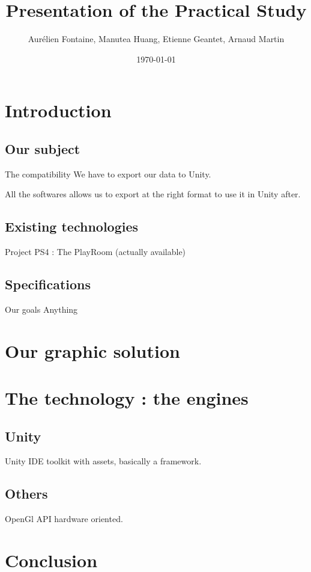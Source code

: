\documentclass[a4paper,10pt]{beamer}
\title{Presentation of the Practical Study}
\author[Groupe 3INFO]{Aurélien Fontaine, Manutea Huang, Etienne Geantet, Arnaud Martin}
\institute[INSA de Rennes]{Institut National des Sciences Appliquées de Rennes}
\date{\today}
\begin{document}
	\begin{frame}
		\titlepage
	\end{frame}
	
	\begin{frame}
		\tableofcontents
	\end{frame}
	
	\section{Introduction}
	
		\subsection{Our subject}
	
			\begin{frame}{}
				\begin{block}{The compatibility}
					We have to export our data to Unity.
				\end{block}
				All the softwares allows us to export at the right format to use it in Unity after.
			\end{frame}
			
		\subsection{Existing technologies}
			
			\begin{frame}{}
				Project PS4 : The PlayRoom (actually available)
			\end{frame}
		
		\subsection{Specifications}
		
			\begin{frame}{Our goals}
				Anything
			\end{frame}
	
	\section{Our graphic solution}
	
	\section{The technology : the engines}
	
		\subsection{Unity}
		
			\begin{frame}{Unity}
				IDE toolkit with assets, basically a framework.
			\end{frame}
			
		\subsection{Others}
			
			\begin{frame}{OpenGl}
				API hardware oriented.
			\end{frame}
			
	\section{Conclusion}
	
\end{document}
